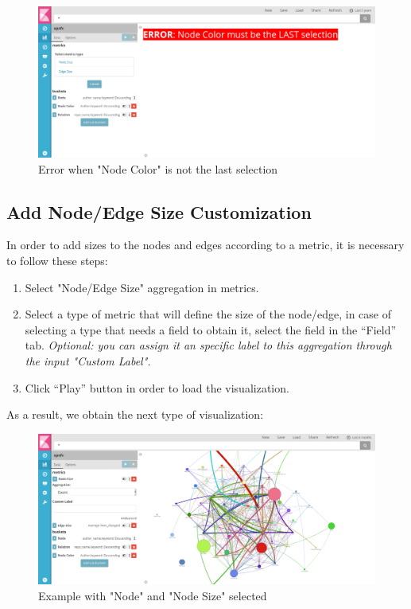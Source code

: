 \documentclass[a4paper, 12pt]{book}
\begin{document}
\begin{itemize}
\begin{figure}[H]
  \centering
  \includegraphics[width=16cm, keepaspectratio]{img/results/errornodecolor}
  \caption{Error when "Node Color" is not the last selection}
  \label{fig:errornodecolor}
\end{figure}

\end{itemize}

\subsection{Add Node/Edge Size Customization}

In order to add sizes to the nodes and edges according to a metric, it is necessary to follow these steps:

\begin{enumerate}
\item Select "Node/Edge Size" aggregation in metrics.
\item Select a type of metric that will define the size of the node/edge, in case of selecting a type that needs a field to obtain it, select the field in the “Field” tab. \textit{Optional: you can assign it an specific label to this aggregation through the input "Custom Label".}
\item Click “Play” button in order to load the visualization.
\end{enumerate}

As a result, we obtain the next type of visualization:

\begin{figure}[H]
  \centering
  \includegraphics[width=16cm, keepaspectratio]{img/results/sizes}
  \caption{Example with "Node" and "Node Size" selected}
  \label{fig:sizes}
\end{figure}
\end{document}
